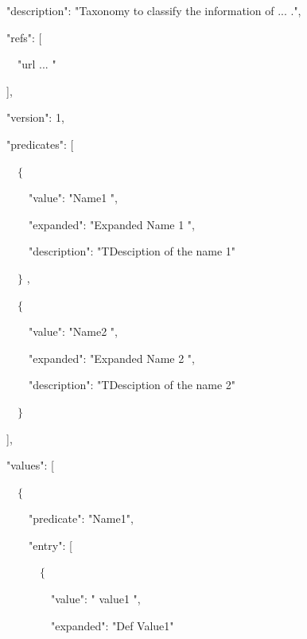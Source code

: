 \documentclass[12pt]{report}
\begin{document}
\  "description": "Taxonomy to classify the information of ... .",\par

\  "refs": [\par

\ \ \  "url ... "\par

\  ],\par

\  "version": 1,\par

\  "predicates": [\par

\ \ \  $ \{ $ \par

\ \ \ \ \  "value": "Name1 ",\par

\ \ \ \ \  "expanded": "Expanded Name 1 ",\par

\ \ \ \ \  "description": "TDesciption of the name 1"\par

\ \ \  $ \} $ ,\par

\ \ \  $ \{ $ \par

\ \ \ \ \  "value": "Name2 ",\par

\ \ \ \ \  "expanded": "Expanded Name 2 ",\par

\ \ \ \ \  "description": "TDesciption of the name 2"\par

\ \ \  $ \} $ \par

\  ],\par

\  "values": [\par

\ \ \  $ \{ $ \par

\ \ \ \ \  "predicate": "Name1",\par

\ \ \ \ \  "entry": [\par

\ \ \ \ \ \ \  $ \{ $ \par

\ \ \ \ \ \ \ \ \  "value": " value1 ",\par

\ \ \ \ \ \ \ \ \  "expanded": "Def Value1"\par
\end{document}
